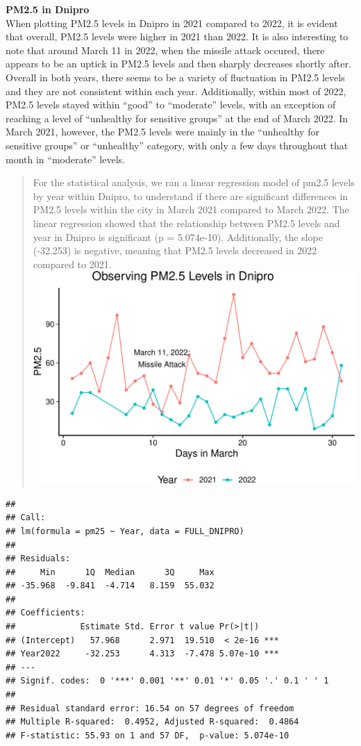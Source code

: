 \documentclass[
  12pt,
]{article}
\begin{document}
\textbf{PM2.5 in Dnipro}\\
When plotting PM2.5 levels in Dnipro in 2021 compared to 2022, it is
evident that overall, PM2.5 levels were higher in 2021 than 2022. It is
also interesting to note that around March 11 in 2022, when the missile
attack occured, there appears to be an uptick in PM2.5 levels and then
sharply decreases shortly after. Overall in both years, there seems to
be a variety of fluctuation in PM2.5 levels and they are not consistent
within each year. Additionally, within most of 2022, PM2.5 levels stayed
within ``good'' to ``moderate'' levels, with an exception of reaching a
level of ``unhealthy for sensitive groups'' at the end of March 2022. In
March 2021, however, the PM2.5 levels were mainly in the ``unhealthy for
sensitive groups'' or ``unhealthy'' category, with only a few days
throughout that month in ``moderate'' levels.

\begin{quote}
For the statistical analysis, we ran a linear regression model of pm2.5
levels by year within Dnipro, to understand if there are significant
differences in PM2.5 levels within the city in March 2021 compared to
March 2022. The linear regression showed that the relationship between
PM2.5 levels and year in Dnipro is significant (p = 5.074e-10).
Additionally, the slope (-32.253) is negative, meaning that PM2.5 levels
decreased in 2022 compared to 2021.
\includegraphics{Fontanie_Gordon_Weinberg_Project_files/figure-latex/Analyzing 25 in Dnipro-1.pdf}
\end{quote}

\begin{verbatim}
## 
## Call:
## lm(formula = pm25 ~ Year, data = FULL_DNIPRO)
## 
## Residuals:
##     Min      1Q  Median      3Q     Max 
## -35.968  -9.841  -4.714   8.159  55.032 
## 
## Coefficients:
##             Estimate Std. Error t value Pr(>|t|)    
## (Intercept)   57.968      2.971  19.510  < 2e-16 ***
## Year2022     -32.253      4.313  -7.478 5.07e-10 ***
## ---
## Signif. codes:  0 '***' 0.001 '**' 0.01 '*' 0.05 '.' 0.1 ' ' 1
## 
## Residual standard error: 16.54 on 57 degrees of freedom
## Multiple R-squared:  0.4952, Adjusted R-squared:  0.4864 
## F-statistic: 55.93 on 1 and 57 DF,  p-value: 5.074e-10
\end{verbatim}
\end{document}
